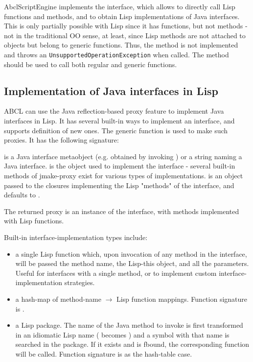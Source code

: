 \documentclass[10pt]{book}
\begin{document}
AbclScriptEngine implements the 
interface, which allows to directly call Lisp functions and methods,
and to obtain Lisp implementations of Java interfaces. This is only
partially possible with Lisp since it has functions, but not methods -
not in the traditional OO sense, at least, since Lisp methods are not
attached to objects but belong to generic functions. Thus, the method
 is not implemented and throws an
\texttt{UnsupportedOperationException} when called. The 
method should be used to call both regular and generic functions.

\subsection{Implementation of Java interfaces in Lisp}

ABCL can use the Java reflection-based proxy feature to implement Java
interfaces in Lisp. It has several built-in ways to implement an
interface, and supports definition of new ones. The
 generic function is used to make such
proxies. It has the following signature:


 is a Java interface metaobject (e.g. obtained by
invoking ) or a string naming a Java
interface.  is the object used to implement the
interface - several built-in methods of jmake-proxy exist for various
types of implementations.  is an object passed to the
closures implementing the Lisp "methods" of the interface, and
defaults to .

The returned proxy is an instance of the interface, with methods
implemented with Lisp functions.

Built-in interface-implementation types include:

\begin{itemize}
\item a single Lisp function which, upon invocation of any method in
  the interface, will be passed the method name, the Lisp-this object,
  and all the parameters. Useful for interfaces with a single method,
  or to implement custom interface-implementation strategies.
\item a hash-map of method-name $\rightarrow$ Lisp function mappings. Function
  signature is .
\item a Lisp package. The name of the Java method to invoke is first
  transformed in an idiomatic Lisp name ( becomes
  ) and a symbol with that name is searched in
  the package. If it exists and is fbound, the corresponding function
  will be called. Function signature is as the hash-table case.
\end{itemize}
\end{document}
